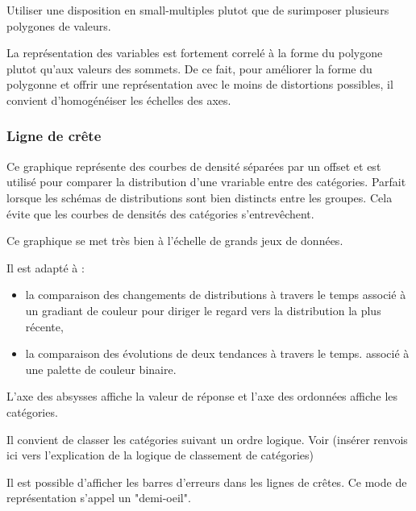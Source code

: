\documentclass[a4paper,12pt]{article}
\begin{document}
\begin{multicols}{2}
Utiliser une disposition en small-multiples plutot que de surimposer plusieurs polygones de valeurs. \autocite{jonathanschwabishRelationship2021}

La représentation des variables est fortement correlé à la forme du polygone plutot qu'aux valeurs des sommets. \autocite{sosulskiGraphics2019} De ce fait, pour améliorer la forme du polygonne et offrir une représentation avec le moins de distortions possibles, il convient d'homogénéiser les échelles des axes.
\subsubsection{Ligne de crête}
\label{sec:orgce0e147}
Ce graphique représente des courbes de densité séparées par un offset et est utilisé pour comparer la distribution d'une vrariable entre des catégories. \autocite{wilkeVisualizingManyDistributions2019} Parfait lorsque les schémas de distributions sont bien distincts entre les groupes. \autocite{mikeyiHowChooseRight2020} Cela évite que les courbes de densités des catégories s'entrevêchent.\autocite{jonathanschwabishDistribution2021}

Ce graphique se met très bien à l'échelle de grands jeux de données. \autocite{wilkeVisualizingManyDistributions2019}

Il est adapté à :
\begin{itemize}
\item la comparaison des changements de distributions à travers le temps \autocite{wilkeDirectoryVisualizations2019} associé à un gradiant de couleur pour diriger le regard vers la distribution la plus récente, \autocite{jonathanschwabishDistribution2021}
\item la comparaison des évolutions de deux tendances à travers le temps. \autocite{wilkeVisualizingManyDistributions2019} associé à une palette de couleur binaire.
\end{itemize}

L'axe des absysses affiche la valeur de réponse et l'axe des ordonnées affiche les catégories. \autocite{wilkeVisualizingManyDistributions2019}

Il convient de classer les catégories suivant un ordre logique. \autocite{jonathanschwabishDistribution2021} Voir (insérer renvois ici vers l'explication de la logique de classement de catégories)

Il est possible d'afficher les barres d'erreurs dans les lignes de crêtes. Ce mode de représentation s'appel un "demi-oeil". \autocite{wilkeVisualizingUncertainty2019}


\end{multicols}
\end{document}
